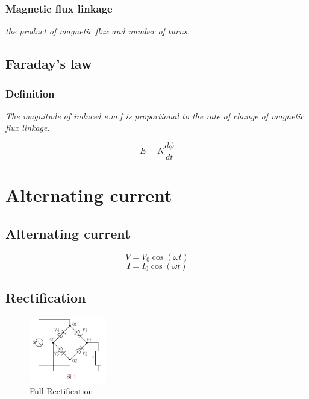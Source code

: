 \documentclass[a4paper,9pt]{scrartcl}
\begin{document}
    \subsubsection{Magnetic flux linkage}
    \textit{the product of magnetic flux and number of turns.}

    \subsection{Faraday's law}

    \subsubsection{Definition}
    \textit{The magnitude of induced e.m.f is proportional to the rate of change of magnetic flux linkage.}

    \begin{displaymath}
        E = N\frac{d\phi}{dt}
    \end{displaymath}


    \section{Alternating current}

    \subsection{Alternating current}
    \begin{displaymath}
        V = V_0\cos({\omega}t)
    \end{displaymath}
    \begin{displaymath}
        I = I_0\cos({\omega}t)
    \end{displaymath}

    \subsection{Rectification}

    \begin{figure}[!htb]
        \centering
        \includegraphics[width=0.3\textwidth]{.images/FullRectification.png}
        \caption{Full Rectification}
    \end{figure}
\end{document}
